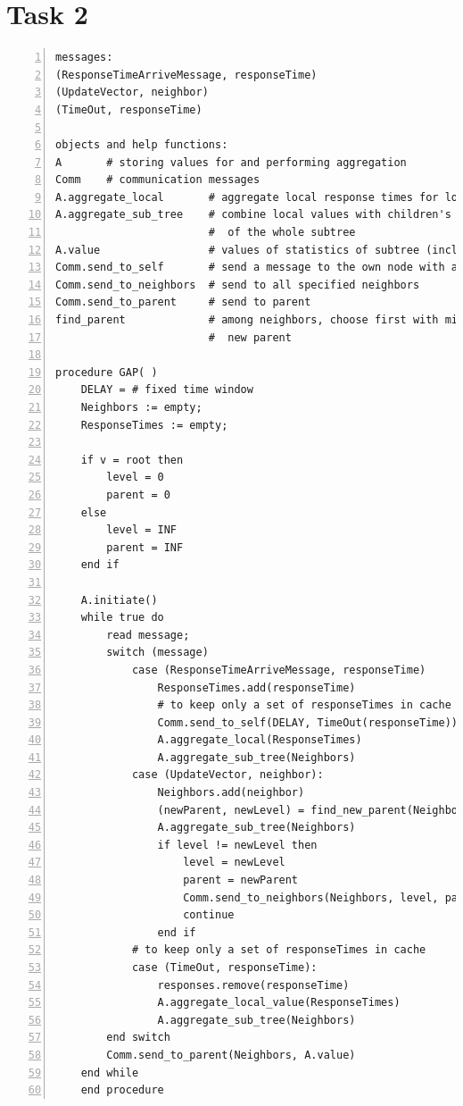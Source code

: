 \documentclass[a4paper, smallheadings,english]{scrartcl}
\begin{document}
\section*{Task 2}
\begin{lstlisting}[caption={inspired by \cite{stadler2012protocols}}, numbers=left, frame=single]
messages:
(ResponseTimeArriveMessage, responseTime)
(UpdateVector, neighbor)
(TimeOut, responseTime)

objects and help functions:
A       # storing values for and performing aggregation
Comm    # communication messages
A.aggregate_local       # aggregate local response times for local statistics
A.aggregate_sub_tree    # combine local values with children's for statistics
                        #  of the whole subtree
A.value                 # values of statistics of subtree (including own)
Comm.send_to_self       # send a message to the own node with a delay
Comm.send_to_neighbors  # send to all specified neighbors
Comm.send_to_parent     # send to parent
find_parent             # among neighbors, choose first with minimum level as
                        #  new parent

procedure GAP( )
    DELAY = # fixed time window
    Neighbors := empty;
    ResponseTimes := empty;

    if v = root then
        level = 0
        parent = 0
    else
        level = INF
        parent = INF
    end if

    A.initiate()
    while true do
        read message;
        switch (message)
            case (ResponseTimeArriveMessage, responseTime)
                ResponseTimes.add(responseTime)
                # to keep only a set of responseTimes in cache
                Comm.send_to_self(DELAY, TimeOut(responseTime))
                A.aggregate_local(ResponseTimes)
                A.aggregate_sub_tree(Neighbors)
            case (UpdateVector, neighbor):
                Neighbors.add(neighbor) 
                (newParent, newLevel) = find_new_parent(Neighbors)
                A.aggregate_sub_tree(Neighbors)
                if level != newLevel then
                    level = newLevel
                    parent = newParent
                    Comm.send_to_neighbors(Neighbors, level, parent, A.value())
                    continue
                end if
            # to keep only a set of responseTimes in cache
            case (TimeOut, responseTime):
                responses.remove(responseTime)
                A.aggregate_local_value(ResponseTimes)
                A.aggregate_sub_tree(Neighbors)
        end switch
        Comm.send_to_parent(Neighbors, A.value)
    end while
    end procedure
\end{lstlisting}
\end{document}
